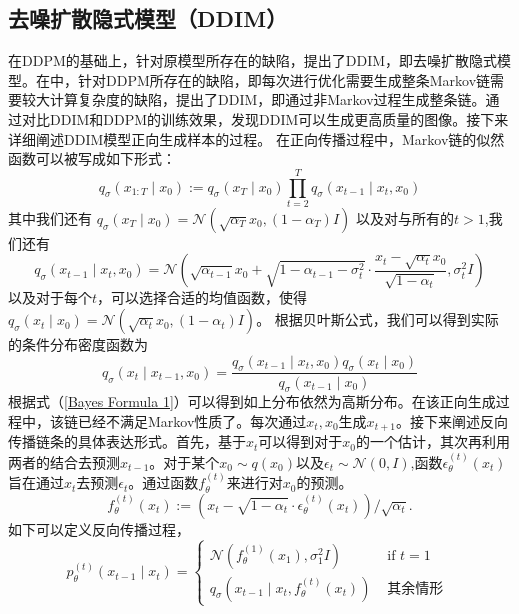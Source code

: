 \subsection{去噪扩散隐式模型（DDIM）}
在DDPM的基础上，针对原模型所存在的缺陷，提出了DDIM，即去噪扩散隐式模型。在\cite{DDIM}中，针对DDPM所存在的缺陷，即每次进行优化需要生成整条Markov链需要较大计算复杂度的缺陷，提出了DDIM，即通过非Markov过程生成整条链。通过对比DDIM和DDPM的训练效果，发现DDIM可以生成更高质量的图像。接下来详细阐述DDIM模型正向生成样本的过程。
在正向传播过程中，Markov链的似然函数可以被写成如下形式：
\begin{equation}
    q_\sigma\left({x}_{1: T} \mid {x}_0\right):=q_\sigma\left({x}_T \mid {x}_0\right) \prod_{t=2}^T q_\sigma\left({x}_{t-1} \mid {x}_t, {x}_0\right)
\end{equation}
其中我们还有 $q_\sigma\left({x}_T \mid {x}_0\right)=\mathcal{N}\left(\sqrt{\alpha_T} {x}_0,\left(1-\alpha_T\right) {I}\right)$ 以及对与所有的$t>1$,我们还有
$$
q_\sigma\left({x}_{t-1} \mid {x}_t, {x}_0\right)=\mathcal{N}\left(\sqrt{\alpha_{t-1}} {x}_0+\sqrt{1-\alpha_{t-1}-\sigma_t^2} \cdot \frac{{x}_t-\sqrt{\alpha_t} {x}_0}{\sqrt{1-\alpha_t}}, \sigma_t^2 {I}\right)
$$
以及对于每个$t$，可以选择合适的均值函数，使得$q_\sigma\left({x}_t \mid {x}_0\right)=\mathcal{N}\left(\sqrt{\alpha_t} {x}_0,\left(1-\alpha_t\right) {I}\right)$。
根据贝叶斯公式，我们可以得到实际的条件分布密度函数为
\begin{equation}
   q_\sigma\left({x}_t \mid {x}_{t-1}, {x}_0\right)=\frac{q_\sigma\left({x}_{t-1} \mid {x}_t, {x}_0\right) q_\sigma\left({x}_t \mid {x}_0\right)}{q_\sigma\left({x}_{t-1} \mid {x}_0\right)}
   \label{Bayes Formula 1}
\end{equation}
根据式（\ref{Bayes Formula 1}）可以得到如上分布依然为高斯分布。在该正向生成过程中，该链已经不满足Markov性质了。每次通过${x}_t,{x}_0$生成${x}_{t+1}$。接下来阐述反向传播链条的具体表达形式。首先，基于${x}_t$可以得到对于${x}_0$的一个估计，其次再利用两者的结合去预测${x}_{t-1}$。对于某个${x}_0\sim q({x}_0)$以及$\epsilon_t \sim \mathcal{N}(0,I)$,函数$\epsilon_{\theta}^{(t)}({x}_t)$旨在通过${x}_t$去预测$\epsilon_t$。通过函数$f^{(t)}_{\theta}$来进行对${x}_0$的预测。
\begin{equation}
f_\theta^{(t)}\left({x}_t\right):=\left({x}_t-\sqrt{1-\alpha_t} \cdot \epsilon_\theta^{(t)}\left({x}_t\right)\right) / \sqrt{\alpha_t}.
\end{equation}
如下可以定义反向传播过程，
\begin{equation}
 p_\theta^{(t)}\left({x}_{t-1} \mid {x}_t\right)= \begin{cases}\mathcal{N}\left(f_\theta^{(1)}\left({x}_1\right), \sigma_1^2 {I}\right) & \text { if } t=1 \\ q_\sigma\left({x}_{t-1} \mid {x}_t, f_\theta^{(t)}\left({x}_t\right)\right) & \text { 其余情形 }\end{cases}   
\end{equation}
